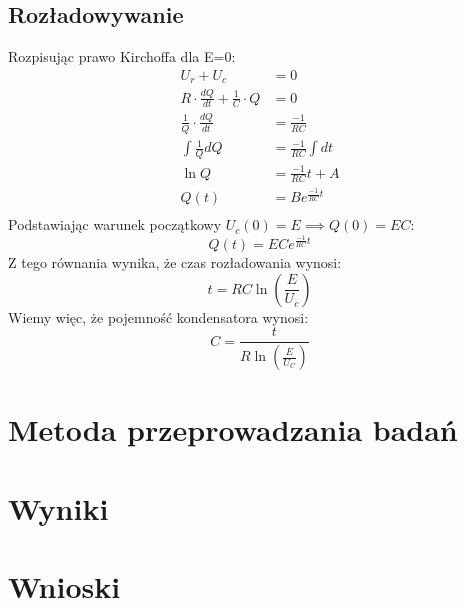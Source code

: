 \documentclass[12pt, a4paper]{article}
\begin{document}
\subsection{Rozładowywanie}
	Rozpisując prawo Kirchoffa dla E=0:
	\begin{align*}
		U_r + U_c &= 0 \\
		R \cdot \frac{dQ}{dt} + \frac{1}{C} \cdot Q &= 0 \\
		\frac{1}{Q} \cdot \frac{dQ}{dt} &= \frac{-1}{RC} \\
		\int \frac{1}{Q} dQ &= \frac{-1}{RC} \int dt \\
		\ln Q &= \frac{-1}{RC}t + A \\
		Q(t) &= Be^{\frac{-1}{RC}t} \\		
	\end{align*}
	Podstawiając warunek początkowy $U_c(0) = E \implies Q(0) = EC$:
	$$Q(t) = ECe^{\frac{-1}{RC}t}$$
	Z tego równania wynika, że czas rozładowania wynosi:
	$$t = RC \ln(\frac{E}{U_c}) $$
	Wiemy więc, że pojemność kondensatora wynosi:
	$$C = \dfrac{t}{R \ln(\frac{E}{U_C})}$$
\section{Metoda przeprowadzania badań}

\section{Wyniki}

\section{Wnioski}
	

\end{document}
